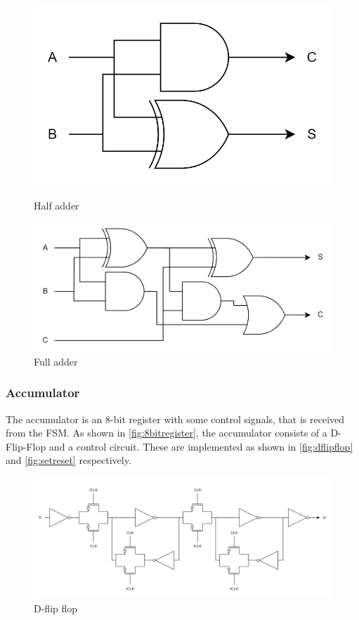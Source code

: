 \begin{figure}[H]
\begin{minipage}{0.4\textwidth}
    \centering
    \includegraphics[width=\linewidth]{Figures/halfadder.png}
    \caption{Half adder}
    \label{fig:halfadder}
\end{minipage}
\begin{minipage}{0.6\textwidth}
    \centering
    \includegraphics[width=\linewidth]{Figures/fulladder.png}
    \caption{Full adder}
    \label{fig:fulladder}
\end{minipage}
\end{figure}


\subsubsection{Accumulator}
\label{subsubsec:accumulator}
The accumulator is an 8-bit register with some control signals, that is received from the FSM. As shown in \autoref{fig:8bitregister}, the accumulator consists of a D-Flip-Flop and a control circuit. These are implemented as shown in \autoref{fig:dflipflop} and \ref{fig:setreset} respectively.

\begin{figure}[H]
    \centering
    \includegraphics[width=\textwidth]{Figures/D_Flip_Flop.png}
    \caption{D-flip flop}
    \label{fig:dflipflop}
\end{figure}

